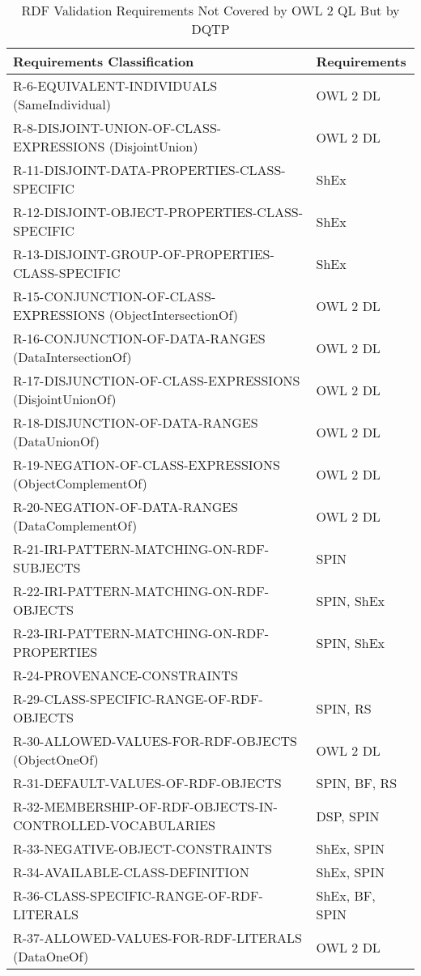 \documentclass{llncs}
\newcommand{\hr}{\hline\noalign{\smallskip}} %
\begin{document}
\begin{table}
\caption{RDF Validation Requirements Not Covered by OWL 2 QL But by DQTP}
\label{tab:RequirementsCoveredShEx}
\centering
\begin{tabular}{ll}
\hr
Requirements Classification & Requirements \\
\hr
R-6-EQUIVALENT-INDIVIDUALS (SameIndividual) & OWL 2 DL \\
R-8-DISJOINT-UNION-OF-CLASS-EXPRESSIONS (DisjointUnion) & OWL 2 DL \\
R-11-DISJOINT-DATA-PROPERTIES-CLASS-SPECIFIC & ShEx \\
R-12-DISJOINT-OBJECT-PROPERTIES-CLASS-SPECIFIC & ShEx \\
R-13-DISJOINT-GROUP-OF-PROPERTIES-CLASS-SPECIFIC & ShEx \\
R-15-CONJUNCTION-OF-CLASS-EXPRESSIONS (ObjectIntersectionOf) & OWL 2 DL \\
R-16-CONJUNCTION-OF-DATA-RANGES (DataIntersectionOf) & OWL 2 DL \\
R-17-DISJUNCTION-OF-CLASS-EXPRESSIONS (DisjointUnionOf) & OWL 2 DL \\
R-18-DISJUNCTION-OF-DATA-RANGES (DataUnionOf) & OWL 2 DL \\
R-19-NEGATION-OF-CLASS-EXPRESSIONS (ObjectComplementOf) & OWL 2 DL \\
R-20-NEGATION-OF-DATA-RANGES (DataComplementOf) & OWL 2 DL \\
R-21-IRI-PATTERN-MATCHING-ON-RDF-SUBJECTS & SPIN \\
R-22-IRI-PATTERN-MATCHING-ON-RDF-OBJECTS & SPIN, ShEx \\
R-23-IRI-PATTERN-MATCHING-ON-RDF-PROPERTIES & SPIN, ShEx \\
R-24-PROVENANCE-CONSTRAINTS & \\
R-29-CLASS-SPECIFIC-RANGE-OF-RDF-OBJECTS & SPIN, RS \\
R-30-ALLOWED-VALUES-FOR-RDF-OBJECTS (ObjectOneOf) & OWL 2 DL \\
R-31-DEFAULT-VALUES-OF-RDF-OBJECTS & SPIN, BF, RS \\
R-32-MEMBERSHIP-OF-RDF-OBJECTS-IN-CONTROLLED-VOCABULARIES & DSP, SPIN \\
R-33-NEGATIVE-OBJECT-CONSTRAINTS & ShEx, SPIN \\
R-34-AVAILABLE-CLASS-DEFINITION & ShEx, SPIN \\
R-36-CLASS-SPECIFIC-RANGE-OF-RDF-LITERALS & ShEx, BF, SPIN \\
R-37-ALLOWED-VALUES-FOR-RDF-LITERALS (DataOneOf) & OWL 2 DL \\

\end{tabular}
\end{table}
\end{document}
